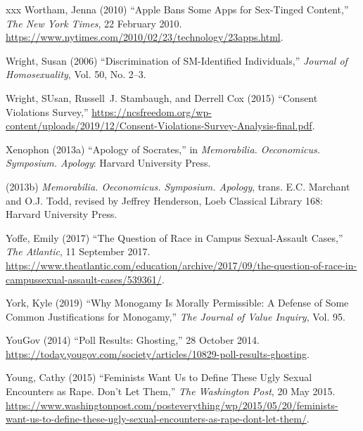 \documentclass[]{jlreq} \usepackage{mystyle}
\begin{document}
\begin{thebibliography}{xxx}
Wortham, Jenna (2010) ``Apple Bans Some Apps for Sex-Tinged Content,''
  \emph{The New York Times}, 22 February 2010.
  \url{https://www.nytimes.com/2010/02/23/technology/23apps.html}.

Wright, Susan (2006) ``Discrimination of SM-Identified Individuals,'' \textit{
  Journal of Homosexuality}, Vol. 50, No. 2--3.

Wright, SUsan, Russell~J. Stambaugh, and Derrell Cox (2015) ``Consent
  Violations Survey,''
  \url{https://ncsfreedom.org/wp-content/uploads/2019/12/Consent-Violations-Survey-Analysis-final.pdf}.

Xenophon (2013a) ``Apology of Socrates,'' in  \textit{ Memorabilia.
  Oeconomicus. Symposium. Apology}: Harvard University Press.

 \bysame{}  (2013b)  \textit{ Memorabilia. Oeconomicus. Symposium. Apology},
  trans. E.C. Marchant and O.J. Todd, revised by Jeffrey Henderson, Loeb
  Classical Library 168: Harvard University Press.

Yoffe, Emily (2017) ``The Question of Race in Campus Sexual-Assault Cases,''
  \emph{The Atlantic}, 11 September 2017.
  \url{https://www.theatlantic.com/education/archive/2017/09/the-question-of-race-in-campussexual-assault-cases/539361/}.

York, Kyle (2019) ``Why Monogamy Is Morally Permissible: A Defense of Some
  Common Justifications for Monogamy,'' \textit{ The Journal of Value Inquiry},
  Vol. 95.

YouGov (2014) ``Poll Results: Ghosting,'' 28 October 2014.
  \url{https://today.yougov.com/society/articles/10829-poll-results-ghosting}.

Young, Cathy (2015) ``Feminists Want Us to Define These Ugly Sexual Encounters
  as Rape. Don't Let Them,'' \emph{The Washington Post}, 20 May 2015.
  \url{https://www.washingtonpost.com/posteverything/wp/2015/05/20/feminists-want-us-to-define-these-ugly-sexual-encounters-as-rape-dont-let-them/}.


\end{thebibliography}
\end{document}

